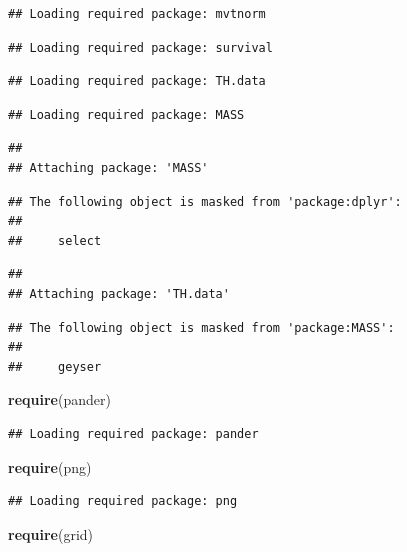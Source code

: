 \documentclass[]{article}
\newenvironment{Shaded}{\begin{snugshade}}{\end{snugshade}}
\newcommand{\KeywordTok}[1]{\textcolor[rgb]{0.13,0.29,0.53}{\textbf{{#1}}}}
\newcommand{\NormalTok}[1]{{#1}}
\begin{document}
\begin{verbatim}
## Loading required package: mvtnorm
\end{verbatim}

\begin{verbatim}
## Loading required package: survival
\end{verbatim}

\begin{verbatim}
## Loading required package: TH.data
\end{verbatim}

\begin{verbatim}
## Loading required package: MASS
\end{verbatim}

\begin{verbatim}
## 
## Attaching package: 'MASS'
\end{verbatim}

\begin{verbatim}
## The following object is masked from 'package:dplyr':
## 
##     select
\end{verbatim}

\begin{verbatim}
## 
## Attaching package: 'TH.data'
\end{verbatim}

\begin{verbatim}
## The following object is masked from 'package:MASS':
## 
##     geyser
\end{verbatim}

\begin{Shaded}
\begin{Highlighting}[]
\KeywordTok{require}\NormalTok{(pander)}
\end{Highlighting}
\end{Shaded}

\begin{verbatim}
## Loading required package: pander
\end{verbatim}

\begin{Shaded}
\begin{Highlighting}[]
\KeywordTok{require}\NormalTok{(png)}
\end{Highlighting}
\end{Shaded}

\begin{verbatim}
## Loading required package: png
\end{verbatim}

\begin{Shaded}
\begin{Highlighting}[]
\KeywordTok{require}\NormalTok{(grid)}
\end{Highlighting}
\end{Shaded}
\end{document}
